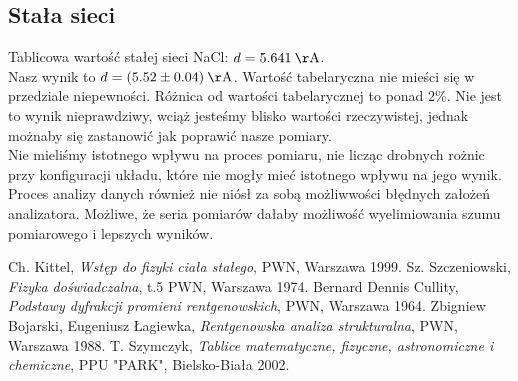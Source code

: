\documentclass[paper=a4, fontsize=12pt]{scrartcl}
\begin{document}
\subsection{Stała sieci}
Tablicowa wartość stałej sieci NaCl: $d=5.641\:\mathrm{\AA}$.\\
Nasz wynik to $d=(5.52\pm0.04)\:\mathrm{\AA}$. Wartość tabelaryczna nie mieści się w przedziale niepewności. Różnica od wartości tabelarycznej to ponad $2\%$. Nie jest to wynik nieprawdziwy, wciąż jesteśmy blisko wartości rzeczywistej, jednak możnaby się zastanowić jak poprawić nasze pomiary.\\
Nie mieliśmy istotnego wpływu na proces pomiaru, nie licząc drobnych rożnic przy konfiguracji układu, które nie mogły mieć istotnego wpływu na jego wynik. Proces analizy danych również nie niósł za sobą możliwwości błędnych założeń analizatora. 
Możliwe, że seria pomiarów dałaby możliwość wyelimiowania szumu pomiarowego i lepszych wyników.
\newpage
\begin{thebibliography}{99}
	 Ch. Kittel, \textit{Wstęp do fizyki ciała stałego}, PWN, Warszawa 1999.
	 Sz. Szczeniowski, \textit{Fizyka doświadczalna}, t.5 PWN, Warszawa
	1974.
	Bernard Dennis Cullity, \emph{Podstawy dyfrakcji promieni rentgenowskich}, PWN, Warszawa
	1964.
	Zbigniew Bojarski, Eugeniusz Łagiewka, \emph{Rentgenowska analiza strukturalna}, PWN,
	Warszawa 1988.
	T. Szymczyk, \emph{Tablice matematyczne, fizyczne, astronomiczne i chemiczne}, PPU "PARK", Bielsko-Biała 2002.
\end{thebibliography}
\end{document}
